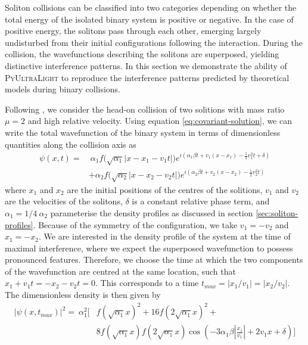\documentclass[a4paper,11pt]{article}
\newcommand{\PyUltraLight}{\textsc{PyUltraLight}\xspace}
\begin{document}
Soliton collisions can be classified into two categories depending on whether the total energy of the isolated binary system is positive or negative. In the case of positive energy, the solitons pass through each other, emerging largely undisturbed from their initial configurations following the interaction. During the collision, the wavefunctions describing the solitons are superposed, yielding distinctive interference patterns. In this section we demonstrate the ability of \PyUltraLight to reproduce the interference patterns predicted by theoretical models during binary collisions. 

Following \cite{Schwabe2016}, we consider the head-on collision of two solitions with mass ratio $\mu=2$ and high relative velocity. Using equation \ref{eq:covariant-solution}, we can write the total wavefunction of the binary system in terms of dimensionless quantities along the collision axis as
\begin{align}
    \psi(x,t)=& \ \alpha_1 f\big(\sqrt{\alpha_1}\vert x-x_1-v_1 t\vert\big)e^{i\left(\alpha_1\beta t+v_1(x-x_1)-\frac{1}{2}v_1^2 t+\delta\right)}\nonumber\\
    &+\alpha_2 f\big(\sqrt{\alpha_2}\vert x-x_2-v_2 t\vert\big)e^{i\left(\alpha_2\beta t+v_2(x-x_2)-\frac{1}{2}v_2^2 t\right)}
\end{align}
where $x_1$ and $x_2$ are the initial positions of the centres of the solitions, $v_1$ and $v_2$ are the velocities of the solitons, $\delta$ is a constant relative phase term, and $\alpha_1=1/4 \ \alpha_2$ parameterise the density profiles as discussed in section \ref{sec:soliton-profiles}. Because of the symmetry of the configuration, we take $v_1=-v_2$ and $x_1=-x_2$. We are interested in the density profile of the system at the time of maximal interference, where we expect the superposed wavefunction to possess pronounced features. Therefore, we choose the time at which the two components of the wavefunction are centred at the same location, such that $x_1+v_1t=-x_2-v_2t=0$. This corresponds to a time $t_{max}=\vert x_1/v_1\vert = \vert x_2/v_2\vert$. The dimensionless density is then given by
\begin{align}\label{eq:predicted-interference}
    \vert\psi(x,t_{max})\vert^2= \ \alpha_1^2\bigg[&f(\sqrt{\alpha_1}x)^2+16f(2\sqrt{\alpha_1}x)^2+\nonumber\\
    &8f(\sqrt{\alpha_1}x)f(2\sqrt{\alpha_1}x)\operatorname{cos}\left(-3\alpha_1\beta\left\vert\frac{x_1}{v_1}\right\vert+2v_1x+\delta \right)\bigg]
\end{align}
\end{document}
